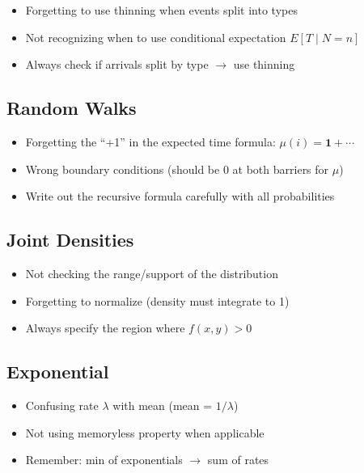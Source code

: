 \documentclass[11pt,letterpaper]{article}
\begin{document}
\begin{itemize}[leftmargin=*]
  \item[\textcolor{red}{$\times$}] Forgetting to use thinning when events split into types
  \item[\textcolor{red}{$\times$}] Not recognizing when to use conditional expectation $E[T \mid N = n]$
  \item[\textcolor{green!60!black}{$\checkmark$}] Always check if arrivals split by type $\rightarrow$ use thinning
\end{itemize}

\subsection{Random Walks}

\begin{itemize}[leftmargin=*]
  \item[\textcolor{red}{$\times$}] Forgetting the ``+1'' in the expected time formula: $\mu(i) = \mathbf{1} + \cdots$
  \item[\textcolor{red}{$\times$}] Wrong boundary conditions (should be 0 at both barriers for $\mu$)
  \item[\textcolor{green!60!black}{$\checkmark$}] Write out the recursive formula carefully with all probabilities
\end{itemize}

\subsection{Joint Densities}

\begin{itemize}[leftmargin=*]
  \item[\textcolor{red}{$\times$}] Not checking the range/support of the distribution
  \item[\textcolor{red}{$\times$}] Forgetting to normalize (density must integrate to 1)
  \item[\textcolor{green!60!black}{$\checkmark$}] Always specify the region where $f(x,y) > 0$
\end{itemize}

\subsection{Exponential}

\begin{itemize}[leftmargin=*]
  \item[\textcolor{red}{$\times$}] Confusing rate $\lambda$ with mean (mean = $1/\lambda$)
  \item[\textcolor{red}{$\times$}] Not using memoryless property when applicable
  \item[\textcolor{green!60!black}{$\checkmark$}] Remember: min of exponentials $\rightarrow$ sum of rates
\end{itemize}
\end{document}

